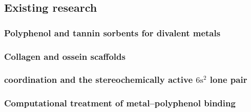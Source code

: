 \subsection{Existing research}
\label{sec:literature}

\subsubsection{Polyphenol and tannin sorbents for divalent metals}
\label{sec:lit-tannin}

\subsubsection{Collagen and ossein scaffolds}
\label{sec:lit-collagen}

\subsubsection{\PbII{} coordination and the stereochemically active $6\mathrm{s}^2$ lone pair}
\label{sec:lit-hemidirection}

\subsubsection{Computational treatment of metal--polyphenol binding}
\label{sec:lit-computational}

